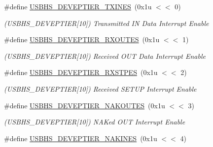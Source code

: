\begin{DoxyCompactItemize}
\#define \mbox{\hyperlink{group__SAMV71__USBHS_gadaf4a6b6fc4cd4f3ccb9f038c0dd961c}{U\+S\+B\+H\+S\+\_\+\+D\+E\+V\+E\+P\+T\+I\+E\+R\+\_\+\+T\+X\+I\+N\+ES}}~(0x1u $<$$<$ 0)
\begin{DoxyCompactList}\small\item\em (U\+S\+B\+H\+S\+\_\+\+D\+E\+V\+E\+P\+T\+I\+ER\mbox{[}10\mbox{]}) Transmitted IN Data Interrupt Enable \end{DoxyCompactList}\item 
\mbox{\label{group__SAMV71__USBHS_ga4c5b287a879e1d4f9a02bbe5a17c8114}} 
\#define \mbox{\hyperlink{group__SAMV71__USBHS_ga4c5b287a879e1d4f9a02bbe5a17c8114}{U\+S\+B\+H\+S\+\_\+\+D\+E\+V\+E\+P\+T\+I\+E\+R\+\_\+\+R\+X\+O\+U\+T\+ES}}~(0x1u $<$$<$ 1)
\begin{DoxyCompactList}\small\item\em (U\+S\+B\+H\+S\+\_\+\+D\+E\+V\+E\+P\+T\+I\+ER\mbox{[}10\mbox{]}) Received O\+UT Data Interrupt Enable \end{DoxyCompactList}\item 
\mbox{\label{group__SAMV71__USBHS_ga5a663a7ed6edeebe0935d7497d01b728}} 
\#define \mbox{\hyperlink{group__SAMV71__USBHS_ga5a663a7ed6edeebe0935d7497d01b728}{U\+S\+B\+H\+S\+\_\+\+D\+E\+V\+E\+P\+T\+I\+E\+R\+\_\+\+R\+X\+S\+T\+P\+ES}}~(0x1u $<$$<$ 2)
\begin{DoxyCompactList}\small\item\em (U\+S\+B\+H\+S\+\_\+\+D\+E\+V\+E\+P\+T\+I\+ER\mbox{[}10\mbox{]}) Received S\+E\+T\+UP Interrupt Enable \end{DoxyCompactList}\item 
\mbox{\label{group__SAMV71__USBHS_ga24822d471dea7d8a4be842541b6ef704}} 
\#define \mbox{\hyperlink{group__SAMV71__USBHS_ga24822d471dea7d8a4be842541b6ef704}{U\+S\+B\+H\+S\+\_\+\+D\+E\+V\+E\+P\+T\+I\+E\+R\+\_\+\+N\+A\+K\+O\+U\+T\+ES}}~(0x1u $<$$<$ 3)
\begin{DoxyCompactList}\small\item\em (U\+S\+B\+H\+S\+\_\+\+D\+E\+V\+E\+P\+T\+I\+ER\mbox{[}10\mbox{]}) N\+A\+Ked O\+UT Interrupt Enable \end{DoxyCompactList}\item 
\mbox{\label{group__SAMV71__USBHS_ga931a5b704dfa8cfeee1cb5650f32d991}} 
\#define \mbox{\hyperlink{group__SAMV71__USBHS_ga931a5b704dfa8cfeee1cb5650f32d991}{U\+S\+B\+H\+S\+\_\+\+D\+E\+V\+E\+P\+T\+I\+E\+R\+\_\+\+N\+A\+K\+I\+N\+ES}}~(0x1u $<$$<$ 4)
$$
\end{DoxyCompactItemize}

